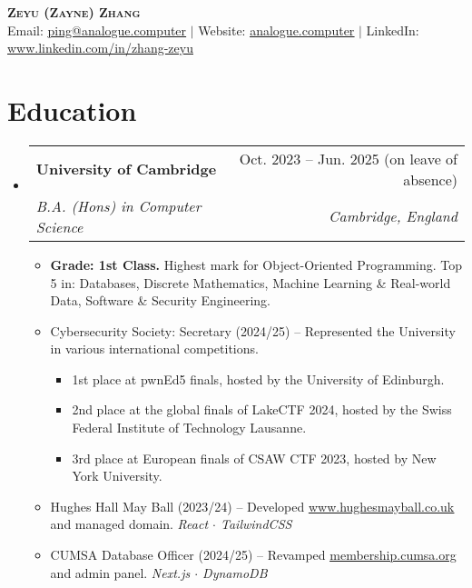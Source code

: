 \documentclass[letterpaper,10pt]{article}
\makeatletter
\newcommand{\link}[2]{\href{#1}{\color{blue}\underline{#2}}}
\newcommand{\resumeItem}[1]{
  \item\small{
    {#1 \vspace{-2pt}}
  }
}
\newcommand{\resumeSubheading}[4]{
  \vspace{-2pt}\item
  \begin{tabular*}{0.97\textwidth}[t]{l@{\extracolsep{\fill}}r}
    \textbf{#1} & #2 \\
    \textit{\small#3} & \textit{\small #4} \\
  \end{tabular*}\vspace{-7pt}
}
\newenvironment{resumeSubHeadingList}{\begin{itemize}[leftmargin=0.15in, label={}]}{\end{itemize}}
\newenvironment{resumeItemList}{\begin{itemize}}{\end{itemize}}
\newenvironment{resumeItemSubList}{\begin{itemize}\setlength\itemsep{0.4em}}{\end{itemize}\vspace{-5pt}}
\makeatother
\begin{document}
\begin{center}
  \textbf{\huge \scshape Zeyu (Zayne) Zhang} \\ \vspace{1pt}
  \small Email: \link{mailto:ping@analogue.computer}{ping@analogue.computer} $|$ Website: \link{https://www.analogue.computer}{analogue.computer} $|$ LinkedIn: \link{https://www.linkedin.com/in/zhang-zeyu}{www.linkedin.com/in/zhang-zeyu}
\end{center}

\section{Education}
\begin{resumeSubHeadingList}
  \resumeSubheading
    {University of Cambridge}{Oct. 2023 -- Jun. 2025 (on leave of absence)}
    {B.A. (Hons) in Computer Science}{Cambridge, England}
    \begin{resumeItemList}
      \resumeItem{\textbf{Grade: 1st Class.}
        Highest mark for Object-Oriented Programming.
        Top 5 in: Databases, Discrete Mathematics, Machine Learning \& Real-world Data, Software \& Security Engineering.}

      \resumeItem{Cybersecurity Society: Secretary (2024/25) -- Represented the
                  University in various international competitions.}

        \begin{resumeItemSubList}
          \resumeItem{1st place at pwnEd5 finals, hosted by the University of Edinburgh.}
          \resumeItem{2nd place at the global finals of LakeCTF 2024, hosted by the Swiss Federal Institute of Technology Lausanne.}
          \resumeItem{3rd place at European finals of CSAW CTF 2023, hosted by New York University.}
        \end{resumeItemSubList}

      \resumeItem{Hughes Hall May Ball (2023/24) -- Developed \link{https://www.hughesmayball.co.uk}{www.hughesmayball.co.uk} and managed
       domain. \textit{React $\cdot$ TailwindCSS} }
      \resumeItem{CUMSA Database Officer (2024/25) -- Revamped \link{https://membership.cumsa.org/}{membership.cumsa.org} and admin panel.
       \textit{Next.js $\cdot$ DynamoDB} }
    \end{resumeItemList}
\end{resumeSubHeadingList}
\end{document}
